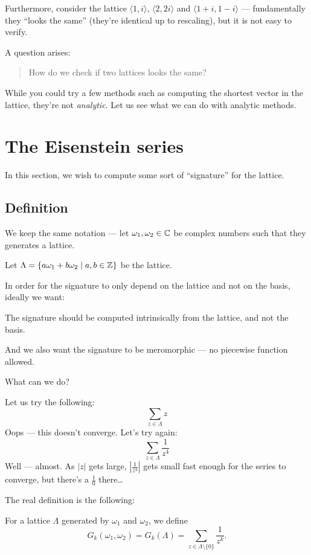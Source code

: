 Furthermore, consider the lattice $\langle 1, i \rangle$, $\langle 2, 2i \rangle$
and $\langle 1+i, 1-i \rangle$ ---
fundamentally they ``looks the same'' (they're identical up to rescaling), but it is not easy to
verify.

A question arises:
\begin{quote}
	How do we check if two lattices looks the same?
\end{quote}
While you could try a few methods such as computing the shortest vector in the lattice,
they're not \emph{analytic}.
Let us see what we can do with analytic methods.

\section{The Eisenstein series}

In this section, we wish to compute some sort of ``signature'' for the lattice.

\subsection{Definition}

We keep the same notation --- let $\omega_1, \omega_2 \in \mathbb C$ be complex numbers
such that they generates a lattice.

Let $\Lambda = \{ a \omega_1+b \omega_2 \mid a, b \in \mathbb Z \}$ be the lattice.

In order for the signature to only depend on the lattice and not on the basis, ideally we want:
\begin{moral}
	The signature should be computed intrinsically from the lattice, and not the basis.
\end{moral}
And we also want the signature to be meromorphic --- no piecewise function allowed.

What can we do?

Let us try the following:
\[ \sum_{z \in \Lambda} z \]
Oops --- this doesn't converge. Let's try again:
\[ \sum_{z \in \Lambda} \frac{1}{z^4} \]
Well --- almost. As $|z|$ gets large, $|\frac{1}{z^4}|$ gets small fast enough for the series to
converge, but there's a $\frac{1}{0}$ there\dots

The real definition is the following:
\begin{definition}
	For a lattice $\Lambda$ generated by $\omega_1$ and $\omega_2$, we define
	\[ G_k(\omega_1, \omega_2) = G_k(\Lambda) =
	\sum_{z \in \Lambda \setminus \{ 0 \}} \frac{1}{z^k}. \]
\end{definition}

